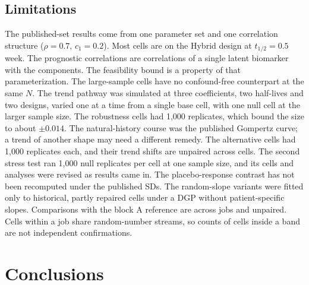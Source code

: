 \documentclass[
  11pt,
]{article}
\begin{document}
\subsection{Limitations}\label{sec-limitations}

The published-set results come from one parameter set and one
correlation structure (\(\rho = 0.7\), \(c_1 = 0.2\)). Most cells are on
the Hybrid design at \(t_{1/2} = 0.5\) week. The prognostic correlations
are correlations of a single latent biomarker with the components.
The feasibility bound is a property of that parameterization. The
large-sample cells have no confound-free counterpart at the same \(N\).
The trend pathway was simulated at three coefficients, two half-lives
and two designs, varied one at a time from a single base cell, with
one null cell at the larger sample size. The robustness cells had
1,000 replicates, which bound the size to about \(\pm 0.014\).
The natural-history course was the published Gompertz curve; a trend
of another shape may need a different remedy. The alternative cells
had 1,000 replicates each, and their trend shifts are unpaired across
cells. The second stress
test ran 1,000 null replicates per cell at one sample size, and its
cells and analyses were revised as results came in. The
placebo-response contrast has not been recomputed under the published
SDs. The random-slope variants were fitted only to historical,
partly repaired cells under a DGP without patient-specific slopes.
Comparisons with the block A reference are across jobs and unpaired.
Cells within a job share random-number streams, so counts of cells
inside a band are not independent confirmations.

\section{Conclusions}\label{sec-conclusions}
\end{document}
